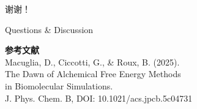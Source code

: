 \documentclass[aspectratio=169,11pt]{beamer}
\begin{document}
\begin{frame}
  \vfill
  \begin{center}
    \Huge\textcolor{iqbblue}{谢谢！}

    \vspace{1cm}

    \Large Questions \& Discussion

    \vspace{1cm}

    \normalsize
    \textbf{参考文献}\\
    Macuglia, D., Ciccotti, G., \& Roux, B. (2025).\\
    The Dawn of Alchemical Free Energy Methods\\
    in Biomolecular Simulations.\\
    J. Phys. Chem. B, DOI: 10.1021/acs.jpcb.5c04731
  \end{center}
  \vfill
\end{frame}

\end{document}
